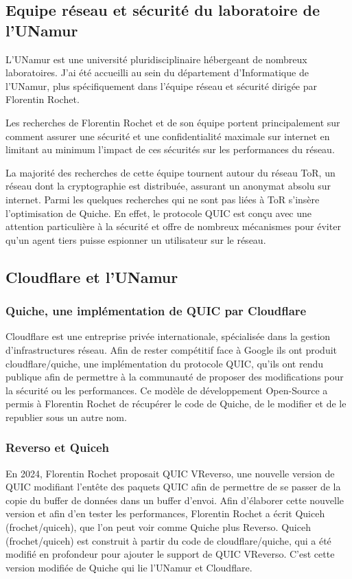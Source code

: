 \subsection{Equipe réseau et sécurité du laboratoire de l'UNamur}

L'UNamur est une université pluridisciplinaire hébergeant de nombreux laboratoires. J'ai été accueilli au sein du département d'Informatique de l'UNamur, plus spécifiquement dans l'équipe réseau et sécurité dirigée par Florentin Rochet.

Les recherches de Florentin Rochet et de son équipe portent principalement sur comment assurer une sécurité et une confidentialité maximale sur internet en limitant au minimum l'impact de ces sécurités sur les performances du réseau.

La majorité des recherches de cette équipe tournent autour du réseau ToR, un réseau dont la cryptographie est distribuée, assurant un anonymat absolu sur internet. Parmi les quelques recherches qui ne sont pas liées à ToR s'insère l'optimisation de Quiche. En effet, le protocole QUIC est conçu avec une attention particulière à la sécurité et offre de nombreux mécanismes pour éviter qu'un agent tiers puisse espionner un utilisateur sur le réseau.

\subsection{Cloudflare et l'UNamur}

\subsubsection{Quiche, une implémentation de QUIC par Cloudflare}

    Cloudflare est une entreprise privée internationale, spécialisée dans la gestion d'infrastructures réseau. Afin de rester compétitif face à Google ils ont produit cloudflare/quiche, une implémentation du protocole QUIC, qu'ils ont rendu publique afin de permettre à la communauté de proposer des modifications pour la sécurité ou les performances. Ce modèle de développement Open-Source a permis à Florentin Rochet de récupérer le code de Quiche, de le modifier et de le republier sous un autre nom.

\subsubsection{Reverso et Quiceh}

    En 2024, Florentin Rochet proposait QUIC VReverso, une nouvelle version de QUIC modifiant l'entête des paquets QUIC afin de permettre de se passer de la copie du buffer de données dans un buffer d'envoi.
    Afin d'élaborer cette nouvelle version et afin d'en tester les performances, Florentin Rochet a écrit Quiceh (frochet/quiceh), que l'on peut voir comme Quiche plus Reverso. Quiceh (frochet/quiceh) est construit à partir du code de cloudflare/quiche, qui a été modifié en profondeur pour ajouter le support de QUIC VReverso.
    C'est cette version modifiée de Quiche qui lie l'UNamur et Cloudflare.
